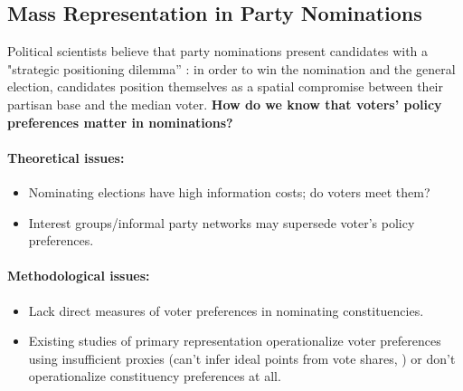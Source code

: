 \documentclass[a0]{a0poster}
\begin{document}
\vspace{2em} %
%
%
%
%
%
%
%
%
\begin{multicols*}{3}

\Large
\raggedright

\raggedcolumns

\section*{Mass Representation in Party Nominations}

Political scientists believe that party nominations present candidates with a "strategic positioning dilemma'' \parencite{brady-han-pope:2007:out-of-step}: in order to win the nomination and the general election, candidates position themselves as a spatial compromise between their partisan base and the median voter. \textsf{\textbf{How do we know that voters' policy preferences matter in nominations?}}

\paragraph{Theoretical issues:}
\begin{itemize}
  \item Nominating elections have high information costs; do voters meet them?
  \item Interest groups/informal party networks may supersede voter's policy preferences.
\end{itemize}

\paragraph{Methodological issues:}
\begin{itemize}
  \item Lack direct measures of voter preferences in nominating constituencies.
  \item Existing studies of primary representation operationalize voter preferences using insufficient proxies (can't infer ideal points from vote shares, \cite{kernell2009giving}) or don't operationalize constituency preferences at all.
\end{itemize}


\end{multicols*}
\end{document}
